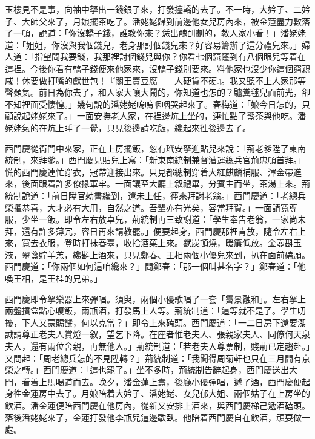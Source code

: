玉樓見不是事，向袖中拏出一錢銀子來，打發擡轎的去了。不一時，大妗子、二妗子、大師父來了，月娘擺茶吃了。潘姥姥歸到前邊他女兒房內來，被金蓮盡力數落了一頓，說道：「你沒轎子錢，誰教你來？恁出醜㓦劃的，教人家小看！」潘姥姥道：「姐姐，你沒與我個錢兒，老身那討個錢兒來？好容易籌辦了這分禮兒來。」婦人道：「指望問我要錢，我那裡討個錢兒與你？你看七個窟窿到有八個眼兒等着在這裡。今後你看有轎子錢便來他家來，沒轎子錢別要來。料他家也沒少你這個窮親戚！休要做打嘴的獻世包！『關王賣豆腐——人硬貨不硬』。我又聽不上人家那等𣭈聲顙氣。前日為你去了，和人家大嚷大鬧的，{}你知道也怎的？驢糞毬兒面前光，卻不知裡面受悽惶。」幾句說的潘姥姥嗚嗚咽咽哭起來了。春梅道：「娘今日怎的，只顧說起姥姥來了。」一面安撫老人家，在裡邊炕上坐的，連忙點了盞茶與他吃。潘姥姥氣的在炕上睡了一覺，只見後邊請吃飯，纔起來徃後邊去了。

西門慶從衙門中來家，正在上房擺飯，忽有玳安拏進貼兒來說：「荊老爹陞了東南統制，來拜爹。」西門慶見貼兒上寫：「新東南統制兼督漕運總兵官荊忠頓首拜。」慌的西門慶連忙穿衣，冠帶迎接出來。只見都總制穿着大紅麒麟補服、渾金帶進來，後面跟着許多僚掾軍牢。一面讓至大廳上叙禮畢，分賓主而坐，茶湯上來。荊統制說道：「前日陞官勑書纔到，還未上任，徑來拜謝老翁。」西門慶道：「老總兵榮擢恭喜，大才必有大用，自然之道。吾輩亦有光矣，容當拜賀。」一面請寬尊服，少坐一飯。即令左右放卓兒，荊統制再三致謝道：「學生奉告老翁，一家尚未拜，還有許多薄冗，容日再來請教罷。」便要起身，西門慶那裡肯放，隨令左右上來，寬去衣服，登時打抹春臺，收拾酒菓上來。獸炭頓燒，暖簾低放。金壺斟玉液，翠盞貯羊羔，纔斟上酒來，只見鄭春、王相兩個小優兒來到，扒在面前磕頭。西門慶道：「你兩個如何這咱纔來？」問鄭春：「那一個叫甚名字？」鄭春道：「他喚王相，是王桂的兄弟。」

西門慶即令拏樂器上來彈唱。須臾，兩個小優歌唱了一套「霽景融和」。左右拏上兩盤攢盒點心嗄飯，兩瓶酒，打發馬上人等。荊統制道：「這等就不是了。學生叨擾，下人又蒙賜饌，何以克當？」即令上來磕頭。西門慶道：「一二日房下還要潔誠請尊正老夫人賞燈一叙，望乞下降。在座者惟老夫人、張親家夫人、同僚何天泉夫人，還有兩位舍親，再無他人。」荊統制道：「若老夫人尊票制，賤荊已定趨赴。」又問起：「周老總兵怎的不見陞轉？」荊統制道：「我聞得周菊軒也只在三月間有京榮之轉。」西門慶道：「這也罷了。」坐不多時，荊統制告辭起身，西門慶送出大門，看着上馬喝道而去。晚夕，潘金蓮上壽，後廳小優彈唱，遞了酒，西門慶便起身徃金蓮房中去了。月娘陪着大妗子、潘姥姥、女兒郁大姐、兩個姑子在上房坐的飲酒。潘金蓮便陪西門慶在他房內，從新又安排上酒來，與西門慶梯己遞酒磕頭。{}落後潘姥姥來了，金蓮打發他李瓶兒這邊歇臥。他陪着西門慶自在飲酒，頑耍做一處。

